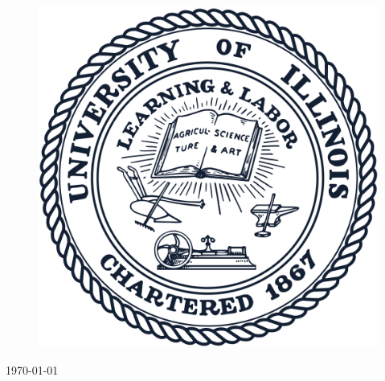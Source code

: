 \begin{titlepage}
	
	\begin{figure}[h]
    \includegraphics[scale=0.1]{UIUC.png}
    \centering
    \end{figure}

	
	\vfill\vfill %
	
	{\large\today} %
	
	
	
	 
	
	\vfill %
\end{titlepage}

